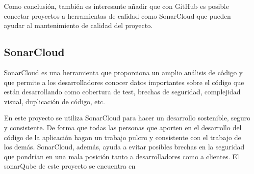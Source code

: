 Como conclusión, también es interesante añadir que con GitHub es posible conectar proyectos a herramientas de calidad como SonarCloud que pueden ayudar al mantenimiento de calidad del proyecto.

\subsection{SonarCloud}
SonarCloud \cite{sonar-cloud} es una herramienta que proporciona un amplio análisis de código y que permite a los desarrolladores conocer datos importantes sobre el código que están desarrollando como cobertura de test, brechas de seguridad, complejidad visual, duplicación de código, etc.

En este proyecto se utiliza SonarCloud para hacer un desarrollo sostenible, seguro y consistente. De forma que todas las personas que aporten en el desarrollo del código de la aplicación hagan un trabajo pulcro y consistente con el trabajo de los demás. SonarCloud, además, ayuda a evitar posibles brechas en la seguridad que pondrían en una mala posición tanto a desarrolladores como a clientes. El sonarQube de este proyecto se encuentra en


